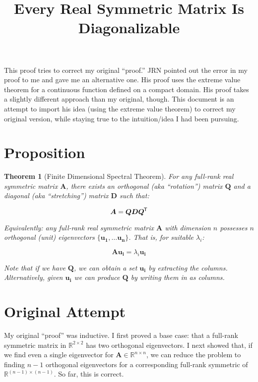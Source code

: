 \documentclass[11pt, oneside]{amsart}
\title{Every Real Symmetric Matrix Is Diagonalizable}
\newtheorem{theorem}{Theorem}
\newcommand{\mtx}[1]{\bm{#1}}
\newcommand*{\tran}{^{\mkern-1.5mu\mathsf{T}}}
\newcommand{\reals}{\mathbb{R}}
\renewcommand{\vec}[1]{\mathbf{#1}}
\newcommand{\mtxspace}[1]{\reals^{#1 \times #1}}
\newcommand{\mtxA}{\mtx{A}}
\newcommand{\mtxD}{\mtx{D}}
\newcommand{\mtxQ}{\mtx{Q}}
\begin{document}
\maketitle

This proof tries to correct my original ``proof.'' JRN pointed out the
error in my proof to me and gave me an alternative one. His proof uses
the extreme value theorem for a continuous function defined on a compact
domain. His proof takes a slightly different approach than my original,
though. This document is an attempt to import his idea (using the
extreme value theorem) to correct my original version, while staying
true to the intuition/idea I had been pursuing.

\section{Proposition}

\begin{theorem}[Finite Dimensional Spectral Theorem]
  For any full-rank real symmetric matrix $\mtxA$, there exists an
  orthogonal (aka ``rotation'') matrix $\mtxQ$ and a diagonal (aka
  ``stretching'') matrix $\mtxD$ such that:

  \[
    \mtxA = \mtxQ \mtxD \mtxQ\tran
  \]

  Equivalently: any full-rank real symmetric matrix $\mtxA$ with
  dimension $n$ possesses $n$ orthogonal (unit) eigenvectors $\{
  \vec{u_1}, \ldots \vec{u_n} \}$. That is, for suitable $\lambda_i$:

  \[
    \mtx{A} \vec{u_i} = \lambda_i \vec{u_i}
  \]

  Note that if we have $\mtxQ$, we can obtain a set $\vec{u_i}$ by
  extracting the columns. Alternatively, given $\vec{u_i}$ we can
  produce $\mtxQ$ by writing them in as columns.
\end{theorem}

\section{Original Attempt}

My original ``proof'' was inductive. I first proved a base case: that a
full-rank symmetric matrix in $\mtxspace{2}$ has two orthogonal
eigenvectors. I next showed that, if we find even a single eigenvector
for $\mtxA \in \mtxspace{n}$, we can reduce the problem to finding $n-1$
orthogonal eigenvectors for a corresponding full-rank symmetric of
$\mtxspace{(n-1)}$. So far, this is correct.
\end{document}
